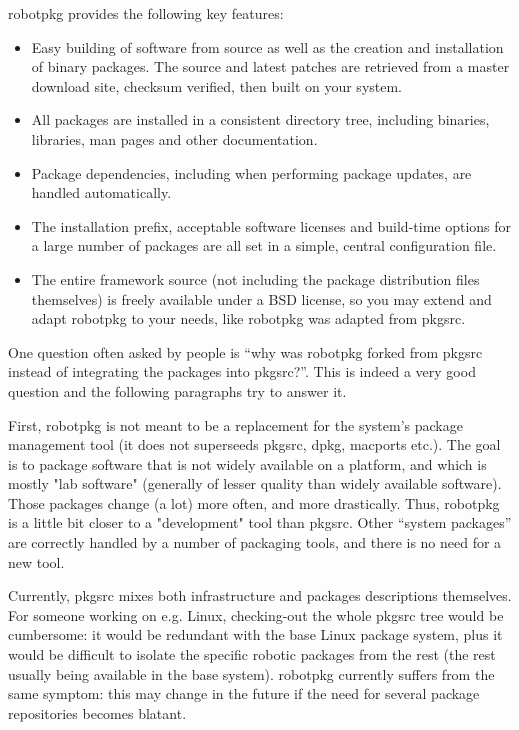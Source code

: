 robotpkg provides the following key features:

\begin{itemize}

   \item Easy building of software  from  source as well   as the creation  and
   installation of binary packages. The source and latest patches are retrieved
   from a master download site, checksum verified, then built on your system.

   \item All  packages are installed in a  consistent directory tree, including
   binaries, libraries, man pages and other documentation.

   \item  Package dependencies, including  when performing package updates, are
   handled automatically.

   \item The installation prefix, acceptable  software licenses and  build-time
   options  for a large  number of packages  are all set  in  a simple, central
   configuration file.

   \item The  entire framework source  (not including the  package distribution
   files themselves) is freely available under a BSD license, so you may extend
   and adapt robotpkg to your needs, like robotpkg was adapted from pkgsrc.

\end{itemize}


One question often asked by people is ``why was robotpkg forked from pkgsrc
instead of integrating the packages into pkgsrc?''. This is indeed a very good
question and the following paragraphs try to answer it.

First,  robotpkg is  not meant  to be  a replacement  for the  system's package
management tool (it does not  superseeds pkgsrc, dpkg, macports etc.). The goal
is to package software that is not widely available on a platform, and which is
mostly  "lab  software" (generally  of  lesser  quality  than widely  available
software).    Those   packages   change   (a   lot)  more   often,   and   more
drastically. Thus, robotpkg is a little bit closer to a "development" tool than
pkgsrc.  Other  ``system  packages''  are  correctly handled  by  a  number  of
packaging tools, and there is no need for a new tool.

Currently, pkgsrc mixes both infrastructure and packages descriptions
themselves. For someone working on e.g. Linux, checking-out
the whole pkgsrc tree would be cumbersome: it would be redundant with the base
Linux package system, plus it would be difficult to isolate the specific
robotic packages from the rest (the rest usually being available in the base
system). robotpkg currently suffers from the same symptom: this may change in
the future if the need for several package repositories becomes blatant.

